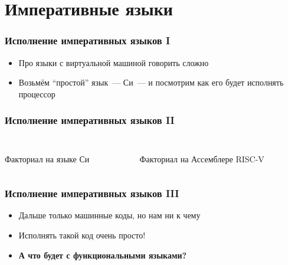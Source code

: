 \section{Императивные языки}

\begin{frame}
    \frametitle{Исполнение императивных языков I}
    \begin{itemize}
        \item Про языки с виртуальной машиной говорить сложно
        \item Возьмём \enquote{простой} язык~--- Си~--- и посмотрим как его будет исполнять процессор
    \end{itemize}

\end{frame}

\begin{frame}[fragile]
    \frametitle{Исполнение императивных языков II}
    \begin{columns}
        \begin{column}{0.5\linewidth}
            \begin{listing}[h]
                \inputminted[firstline=3, fontsize=\footnotesize]{c}{figures/fac.c}
                \caption{Факториал на языке Си}
            \end{listing}
        \end{column}
        \begin{column}{0.5\linewidth}
            \begin{listing}[h]
                \inputminted[fontsize=\scriptsize]{asm}{figures/fac.S}
                \caption{Факториал на Ассемблере RISC-V}
            \end{listing}
        \end{column}
    \end{columns}
\end{frame}

\begin{frame}
    \frametitle{Исполнение императивных языков III}
    \begin{itemize}
        \item Дальше только машинные коды, но нам ни к чему
        \item<+-> Исполнять такой код очень просто!
        \item<+-| alert@+> \textbf{А что будет с функциональными языками?}
    \end{itemize}
\end{frame}

